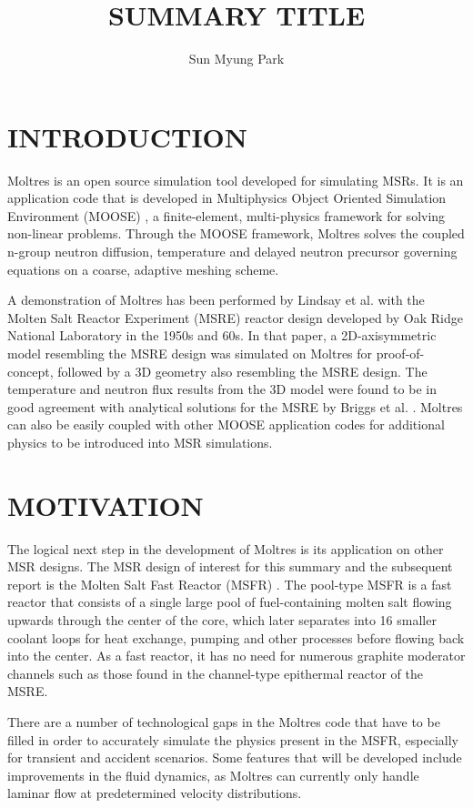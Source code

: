 \documentclass{anstrans}
\title{SUMMARY TITLE}
\author{Sun Myung Park}
\institute{Dept. of Nuclear, Plasma and Radiological Engineering, University of Illinois at Urbana-Champaign \\
smpark3@illinois.edu}
\begin{document}
\section{INTRODUCTION}

Moltres is an open source simulation tool developed for simulating MSRs. It is an application code that is developed in Multiphysics Object Oriented Simulation Environment (MOOSE) \cite{gaston_moose:_2009}, a finite-element, multi-physics framework for solving non-linear problems. Through the MOOSE framework, Moltres solves the coupled n-group neutron diffusion, temperature and delayed neutron precursor governing equations on a coarse, adaptive meshing scheme. 

A demonstration of Moltres has been performed by Lindsay et al. \cite{lindsay_introduction_2018} with the Molten Salt Reactor Experiment (MSRE) reactor design developed by Oak Ridge National Laboratory in the 1950s and 60s. In that paper, a 2D-axisymmetric model resembling the MSRE design was simulated on Moltres for proof-of-concept, followed by a 3D geometry also resembling the MSRE design. The temperature and neutron flux results from the 3D model were found to be in good agreement with analytical solutions for the MSRE by Briggs et al. \cite{briggs_molten-salt_1964}. Moltres can also be easily coupled with other MOOSE application codes for additional physics to be introduced into MSR simulations.

\section{MOTIVATION}

The logical next step in the development of Moltres is its application on other MSR designs. The MSR design of interest for this summary and the subsequent report is the Molten Salt Fast Reactor (MSFR) \cite{serp_molten_2014}. The pool-type MSFR is a fast reactor that consists of a single large pool of fuel-containing molten salt flowing upwards through the center of the core, which later separates into 16 smaller coolant loops for heat exchange, pumping and other processes before flowing back into the center. As a fast reactor, it has no need for numerous graphite moderator channels such as those found in the channel-type epithermal reactor of the MSRE.

There are a number of technological gaps in the Moltres code that have to be filled in order to accurately simulate the physics present in the MSFR, especially for transient and accident scenarios. Some features that will be developed include improvements in the fluid dynamics, as Moltres can currently only handle laminar flow at predetermined velocity distributions.
\end{document}
